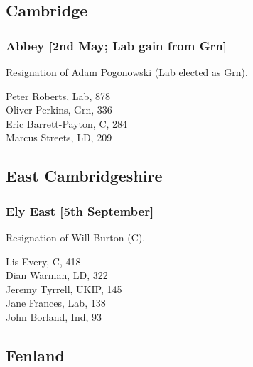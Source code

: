 \documentclass[a4paper,openany,10pt]{book}
\begin{document}
\subsection*{Cambridge}

\subsubsection*{Abbey \hspace*{\fill}\nolinebreak[1]%
\enspace\hspace*{\fill}
[2nd May; Lab gain from Grn]}


Resignation of Adam Pogonowski (Lab elected as Grn).



Peter Roberts, Lab, 878\\
Oliver Perkins, Grn, 336\\
Eric Barrett-Payton, C, 284\\
Marcus Streets, LD, 209\\


\subsection*{East Cambridgeshire}

\subsubsection*{Ely East \hspace*{\fill}\nolinebreak[1]%
\enspace\hspace*{\fill}
[5th September]}


Resignation of Will Burton (C).



Lis Every, C, 418\\
Dian Warman, LD, 322\\
Jeremy Tyrrell, UKIP, 145\\
Jane Frances, Lab, 138\\
John Borland, Ind, 93\\


\subsection*{Fenland}
\end{document}
